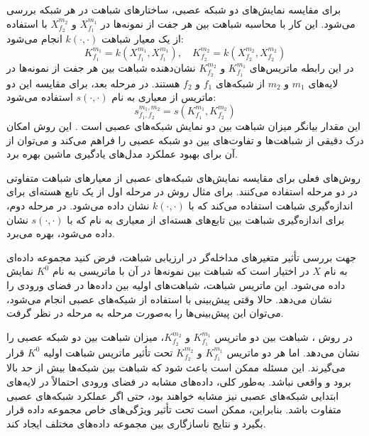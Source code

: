 برای مقایسه نمایش‌های دو شبکه عصبی، ساختارهای شباهت در هر شبکه بررسی می‌شود. این کار با محاسبه شباهت بین هر جفت از نمونه‌ها در \(X^{m_1}_{f_1}\) و \(X^{m_2}_{f_2}\) با استفاده از یک معیار شباهت \( k(\cdot, \cdot) \) انجام می‌شود:
\begin{equation}
	K^{m_1}_{f_1} = k(X^{m_1}_{f_1}, X^{m_1}_{f_1}), \quad K^{m_2}_{f_2} = k(X^{m_2}_{f_2}, X^{m_2}_{f_2})
	\label{eq_dCKA_Kernel}
\end{equation}
در این رابطه ماتریس‌های \(K^{m_1}_{f_1}\) و \(K^{m_2}_{f_2}\) نشان‌دهنده شباهت بین هر جفت از نمونه‌ها در لایه‌های \(m_1\) و \(m_2\) از شبکه‌های \(f_1\) و \(f_2\) هستند. در مرحله بعد، برای مقایسه این دو ماتریس از معیاری به نام \(s(\cdot, \cdot)\) استفاده می‌شود:
\begin{equation}
	s^{m_1,m_2}_{f_1,f_2} = s(K^{m_1}_{f_1}, K^{m_2}_{f_2})
	\label{eq_similarity}
\end{equation}
این مقدار بیانگر میزان شباهت بین دو نمایش شبکه‌های عصبی است
\cite{cui2022deconfounded}.
این روش امکان درک دقیقی از شباهت‌ها و تفاوت‌های بین دو شبکه عصبی را فراهم می‌کند و می‌توان از آن برای بهبود عملکرد مدل‌های یادگیری ماشین بهره برد.

روش‌های فعلی برای مقایسه نمایش‌های شبکه‌های عصبی از معیارهای شباهت متفاوتی در دو مرحله استفاده می‌کنند. برای مثال روش
در مرحله اول از یک تابع هسته‌ای برای اندازه‌گیری شباهت استفاده می‌کند که با \( k(\cdot,\cdot) \) نشان داده می‌شود. در مرحله دوم، برای اندازه‌گیری شباهت بین تابع‌های هسته‌ای از معیاری به نام
که با \( s(\cdot,\cdot) \) نشان داده می‌شود، بهره می‌برد.



جهت بررسی تأثیر متغیرهای مداخله‌گر%
در ارزیابی شباهت، فرض کنید مجموعه داده‌ای به نام \(X\) در اختیار است که شباهت بین نمونه‌ها در آن با ماتریسی به نام
\( K^0 \)
نمایش داده می‌شود. این ماتریس شباهت، شباهت‌های اولیه بین داده‌ها در فضای ورودی را نشان می‌دهد. حالا وقتی پیش‌بینی با استفاده از شبکه‌های عصبی انجام می‌شود، می‌توان این پیش‌بینی‌ها را به‌صورت مرحله به مرحله در نظر گرفت.

در روش
%
، شباهت بین دو ماتریس \(K_{f_1}^{m_1}\) و \(K_{f_2}^{m_2}\)، میزان شباهت بین دو شبکه عصبی را نشان می‌دهد. اما هر دو ماتریس \(K_{f_1}^{m_1}\) و \(K_{f_2}^{m_2}\) تحت تأثیر ماتریس شباهت اولیه
\( K^0 \)
قرار می‌گیرند. این مسئله ممکن است باعث شود که شباهت بین شبکه‌ها بیش از حد بالا برود و واقعی نباشد. به‌طور کلی، داده‌های مشابه در فضای ورودی احتمالاً در لایه‌های ابتدایی شبکه‌های عصبی نیز مشابه خواهند بود، حتی اگر عملکرد شبکه‌های عصبی متفاوت باشد. بنابراین،
ممکن است تحت تأثیر ویژگی‌های خاص مجموعه داده قرار بگیرد و نتایج ناسازگاری بین مجموعه داده‌های مختلف ایجاد کند.

